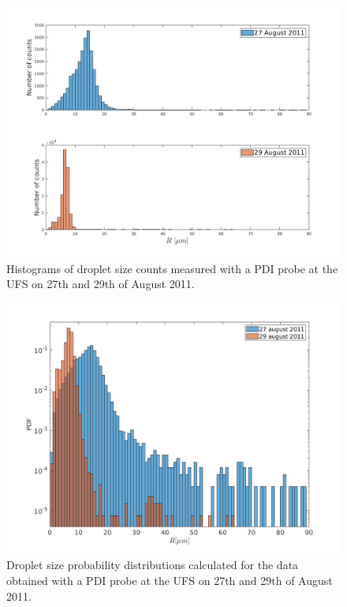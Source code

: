 \documentclass[../main.tex]{subfiles}
\begin{document}
\begin{figure}[h]
\centering
\noindent\includegraphics[width=30pc]{gfx/Hist_counts_raw.png}
\caption{Histograms of droplet size counts measured with a PDI probe at the UFS on 27th and 29th of August 2011.}
\label{fig:ch4_1}
\end{figure}

\begin{figure}[h]
\centering
\noindent\includegraphics[width=30pc]{gfx/PDFs_log.png}
\caption{Droplet size probability distributions calculated for the data obtained with a PDI probe at the UFS on 27th and 29th of August 2011.}
\label{fig:ch4_2}
\end{figure}
\end{document}
